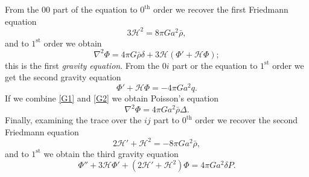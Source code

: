 \documentclass{jknotes}
\begin{document}
From the \(00\) part of the equation to \(0^{\mathrm{th}}\) order we recover the first Friedmann equation
\begin{equation}
    3\mathcal{H}^2 = 8\pi G a^2\bar\rho,
    \tag{F1}
    \label{F1}
\end{equation}
and to \(1^{\mathrm{st}}\) order we obtain
\begin{equation}
    \nabla^2\Phi = 4\pi G\bar\rho\delta + 3\mathcal{H}(\Phi'+\mathcal{H}\Phi);
    \tag{G1}
    \label{G1}
\end{equation}
this is the first \emph{gravity equation}. From the \(0i\) part or the equation to \(1^{\mathrm{st}}\) order we get the second gravity equation
\begin{equation}
    \Phi' + \mathcal{H}\Phi = -4\pi Ga^2q.
    \tag{G2}
    \label{G2}
\end{equation}
If we combine \eqref{G1} and \eqref{G2} we obtain Poisson's equation
\begin{equation}
    \nabla^2\Phi = 4\pi Ga^2\bar\rho\Delta.
    \tag{P}
    \label{P}
\end{equation}
Finally, examining the trace over the \(ij\) part to \(0^{\mathrm{th}}\) order we recover the second Friedmann equation
\begin{equation}
    2\mathcal{H}'+\mathcal{H}^2 = -8\pi G a^2\bar\rho,
    \tag{F2}
    \label{F2}
\end{equation}
and to \(1^{\mathrm{st}}\) we obtain the third gravity equation
\begin{equation}
    \Phi'' + 3\mathcal{H}\Phi' + (2\mathcal{H}'+\mathcal{H}^2)\Phi = 4\pi Ga^2\delta P.
    \tag{G3}
    \label{G3}
\end{equation}
\end{document}
